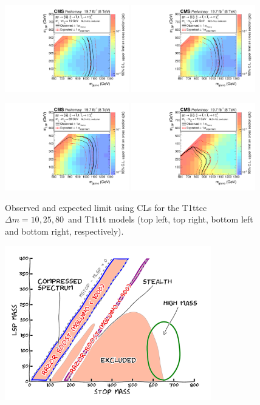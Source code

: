 \begin{figure}[htpb]
\centering
\includegraphics[width=0.48\textwidth]{figures/razor_interpretation/Boost_T1ttcc_DM10_XSEC}
\includegraphics[width=0.48\textwidth]{figures/razor_interpretation/Boost_T1ttcc_DM25_XSEC}

\includegraphics[width=0.48\textwidth]{figures/razor_interpretation/Boost_T1ttcc_DM80_XSEC}
\includegraphics[width=0.48\textwidth]{figures/razor_interpretation/Boost_T1t1t_XSEC}
\caption{Observed and expected limit using CLs for the T1ttcc $\Delta m=10,25,80$~\GeV and T1t1t
models (top left, top right, bottom left and bottom right, respectively). 
\label{fig:boost_limits}}
\end{figure}

\begin{figure}[htpb]
  \centering
  \includegraphics[width=0.8\textwidth]{figures/razor_interpretation/story_boost}
  \caption{
  \label{fig:boost_story_final}}
\end{figure}
